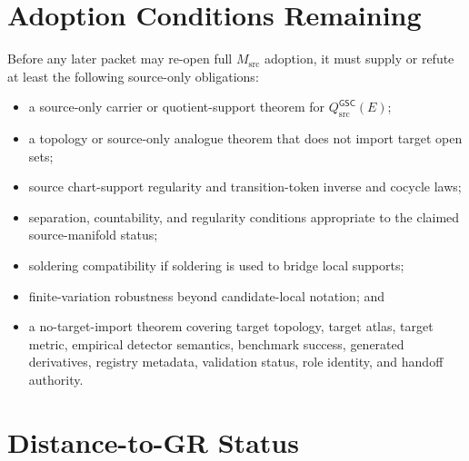 \documentclass[11pt]{article}
\newcommand{\GSC}{\mathsf{GSC}}
\newcommand{\Msrc}{M_{\mathrm{src}}}
\newcommand{\Qsrc}{Q_{\mathrm{src}}^{\GSC}}
\begin{document}
\section{Adoption Conditions Remaining}

Before any later packet may re-open full \(\Msrc\) adoption, it must supply or
refute at least the following source-only obligations:

\begin{itemize}
  \item a source-only carrier or quotient-support theorem for \(\Qsrc(E)\);
  \item a topology or source-only analogue theorem that does not import target
  open sets;
  \item source chart-support regularity and transition-token inverse and
  cocycle laws;
  \item separation, countability, and regularity conditions appropriate to the
  claimed source-manifold status;
  \item soldering compatibility if soldering is used to bridge local supports;
  \item finite-variation robustness beyond candidate-local notation; and
  \item a no-target-import theorem covering target topology, target atlas,
  target metric, empirical detector semantics, benchmark success, generated
  derivatives, registry metadata, validation status, role identity, and handoff
  authority.
\end{itemize}

\section{Distance-to-GR Status}
\end{document}
